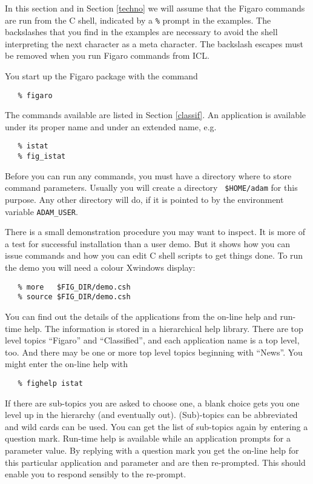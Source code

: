 In this section and in Section \ref{techno} we will assume that the
Figaro commands are run from the C shell, indicated by a {\tt \%} prompt
in the examples.  The backslashes that you find in the examples are
necessary to avoid the shell interpreting the next character as a meta
character.  The backslash escapes must be removed when you run Figaro
commands from ICL.

You start up the Figaro package with the command

\begin{verbatim}
   % figaro
\end{verbatim}

The commands available are listed in Section \ref{classif}.  An
application is available under its proper name and under an extended name,
e.g.

\begin{verbatim}
   % istat
   % fig_istat
\end{verbatim}

Before you can run any commands, you must have a directory where to
store command parameters.  Usually you will create a directory {\tt
\$HOME/adam} for this purpose.  Any other directory will do, if it is
pointed to by the environment variable {\tt ADAM\_USER}.

There is a small demonstration procedure you may want to inspect. It is
more of a test for successful installation than a user demo. But it
shows how you can issue commands and how you can edit C shell scripts to
get things done. To run the demo you will need a colour Xwindows
display:

\begin{verbatim}
   % more   $FIG_DIR/demo.csh
   % source $FIG_DIR/demo.csh
\end{verbatim}

You can find out the details of the applications from the on-line help
and run-time help. The information is stored in a hierarchical help
library. There are top level topics ``Figaro'' and ``Classified'', and
each application name is a top level, too.  And there may be one or more
top level topics beginning with ``News''. You might enter the on-line
help with

\begin{verbatim}
   % fighelp istat
\end{verbatim}

If there are sub-topics you are asked to choose one, a blank choice gets
you one level up in the hierarchy (and eventually out). (Sub)-topics can
be abbreviated and wild cards can be used. You can get the list of
sub-topics again by entering a question mark.
Run-time help is available while an application prompts for a parameter
value.  By replying with a question mark you get the on-line help for
this particular application and parameter and are then re-prompted. This
should enable you to respond sensibly to the re-prompt.

